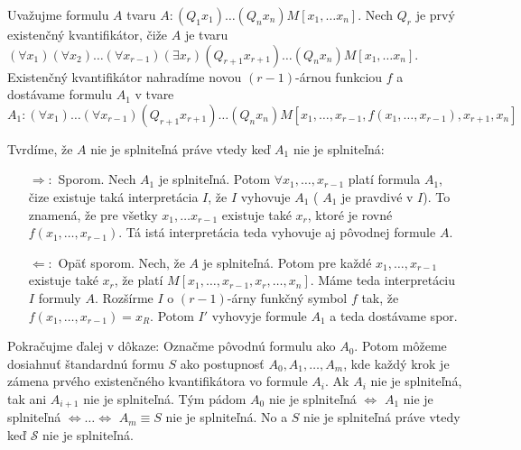 \begin{dokaz}
    Uvažujme formulu $A$ tvaru $A: (Q_1 x_1) \dots (Q_n x_n) M[x_1, \dots x_n]$.
    Nech $Q_r$ je prvý existenčný kvantifikátor, čiže $A$ je tvaru
    $(\forall x_1) (\forall x_2) \dots (\forall x_{r-1}) (\exists x_r)
     (Q_{r+1} x_{r+1}) \dots (Q_n x_n) M[x_1, \dots x_n]$.
    Existenčný kvantifikátor nahradíme novou $(r-1)$-árnou funkciou $f$ a
    dostávame formulu $A_1$ v tvare
    \begin{equation*}
        A_1: (\forall x_1) \dots (\forall x_{r-1}) (Q_{r+1} x_{r+1})  \dots (Q_n x_n)
                M[x_1, \dots, x_{r-1}, f(x_1, \dots, x_{r-1}), x_{r+1}, x_n]
    \end{equation*}

\startFIXME
    \noindent Tvrdíme, že $A$ nie je splniteľná práve vtedy keď $A_1$ nie je splniteľná:
    \begin{itemize}
    \item[$\Rightarrow:$] Sporom. Nech $A_1$ je splniteľná.
        Potom $\forall x_1,\dots,x_{r-1}$ platí formula $A_1$, čize
        existuje taká interpretácia $I$, že $I$ vyhovuje $A_1$ ( $A_1$ je pravdivé v $I$).
        To znamená, že pre všetky $x_1 , \dots x_{r-1}$ existuje také $x_r$,
        ktoré je rovné $f(x_1, \dots, x_{r-1})$.
        Tá istá interpretácia teda vyhovuje aj pôvodnej formule $A$.

    \item[$\Leftarrow:$] Opäť sporom. Nech, že $A$ je splniteľná.
        Potom pre každé $x_1, \dots, x_{r-1}$ existuje také $x_r$, že platí 
        $M[x_1, \dots, x_{r-1}, x_r, \dots, x_n]$.
        Máme teda interpretáciu $I$ formuly $A$. Rozšírme $I$ o $(r-1)$-árny funkčný 
        symbol $f$ tak, že $f(x_1, \dots, x_{r-1}) = x_R$. Potom $I'$
        vyhovyje formule $A_1$ a teda dostávame spor.
    \end{itemize}

    \noindent Pokračujme ďalej v dôkaze:
    Označme pôvodnú formulu ako $A_0$. Potom môžeme dosiahnuť štandardnú formu
    $S$ ako postupnosť $A_0, A_1, \dots, A_m$, kde každý krok je zámena prvého
    existenčného kvantifikátora vo formule $A_i$.
    Ak $A_i$ nie je splniteľná, tak ani $A_{i+1}$ nie je splniteľná.
    Tým pádom $A_0$ nie je splniteľná $\iff$ $A_1$ nie je splniteľná $\iff
    \dots \iff$ $A_m\equiv S$ nie je splniteľná.
    No a $S$ nie je splniteľná práve vtedy keď $\mathscr{S}$ nie je
    splniteľná.
\end{dokaz}


